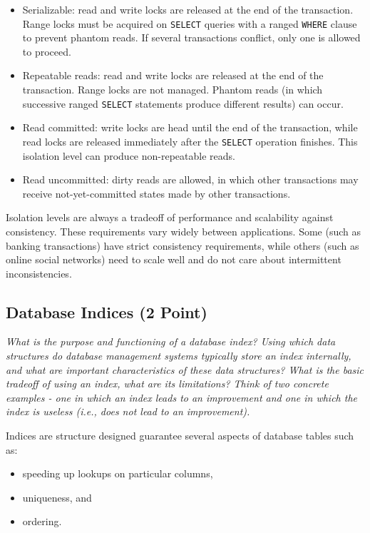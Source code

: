 \documentclass[a4paper,10pt]{article}
\begin{document}
\begin{itemize}
\item Serializable: read and write locks are released at the end of the transaction. Range locks must
      be acquired on \lstinline|SELECT| queries with a ranged \lstinline|WHERE| clause to prevent phantom
      reads. If several transactions conflict, only one is allowed to proceed.
\item Repeatable reads: read and write locks are released at the end of the transaction. Range locks are
      not managed. Phantom reads (in which successive ranged \lstinline|SELECT| statements produce different
      results) can occur.
\item Read committed: write locks are head until the end of the transaction, while read locks are released
      immediately after the \lstinline|SELECT| operation finishes. This isolation level can produce non-repeatable
      reads.
\item Read uncommitted: dirty reads are allowed, in which other transactions may receive not-yet-committed states
      made by other transactions.
\end{itemize}

Isolation levels are always a tradeoff of performance and scalability against consistency.
These requirements vary widely between applications. Some (such as banking transactions) have
strict consistency requirements, while others (such as online social networks) need to scale well and
do not care about intermittent inconsistencies.

\subsection{Database Indices (2 Point)}

\emph{What is the purpose and functioning of a database index? Using which data structures do database
management systems typically store an index internally, and what are important characteristics of these
data structures? What is the basic tradeoff of using an index, what are its limitations? Think of two
concrete examples - one in which an index leads to an improvement and one in which the index is useless
(i.e., does not lead to an improvement).}

\vspace{3mm}

Indices are structure designed guarantee several aspects of database tables such as:

\begin{itemize}
\item speeding up lookups on particular columns,
\item uniqueness, and
\item ordering.
\end{itemize}
\end{document}
